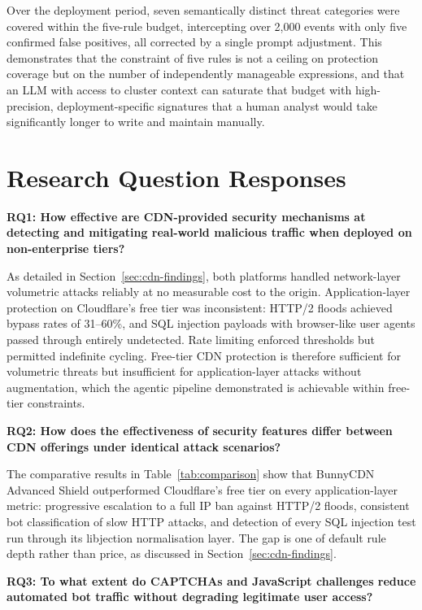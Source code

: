 \documentclass[12pt, a4paper]{report}   %
\begin{document}
Over the deployment period, seven semantically distinct threat
categories were covered within the five-rule budget,
intercepting over 2,000 events with only five confirmed false
positives, all corrected by a single prompt adjustment. This
demonstrates that the constraint of five rules is not a ceiling
on protection coverage but on the number of independently
manageable expressions, and that an LLM with access to cluster
context can saturate that budget with high-precision,
deployment-specific signatures that a human analyst would take
significantly longer to write and maintain manually.

\section{Research Question Responses}

\textbf{RQ1: How effective are CDN-provided security mechanisms
at detecting and mitigating real-world malicious traffic when
deployed on non-enterprise tiers?}

As detailed in Section~\ref{sec:cdn-findings}, both platforms
handled network-layer volumetric attacks reliably at no
measurable cost to the origin. Application-layer protection on
Cloudflare's free tier was inconsistent: HTTP/2 floods achieved
bypass rates of 31--60\%, and SQL injection payloads with
browser-like user agents passed through entirely undetected.
Rate limiting enforced thresholds but permitted indefinite
cycling. Free-tier CDN protection is therefore sufficient for
volumetric threats but insufficient for application-layer
attacks without augmentation, which the agentic pipeline
demonstrated is achievable within free-tier constraints.

\textbf{RQ2: How does the effectiveness of security features
differ between CDN offerings under identical attack scenarios?}

The comparative results in Table~\ref{tab:comparison} show that
BunnyCDN Advanced Shield outperformed Cloudflare's free tier on
every application-layer metric: progressive escalation to a
full IP ban against HTTP/2 floods, consistent bot
classification of slow HTTP attacks, and detection of every SQL
injection test run through its libjection normalisation layer.
The gap is one of default rule depth rather than price, as
discussed in Section~\ref{sec:cdn-findings}.

\textbf{RQ3: To what extent do CAPTCHAs and JavaScript challenges reduce 
automated bot traffic without degrading legitimate user access?}
\end{document}
